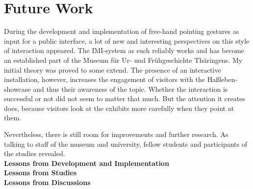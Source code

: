 \chapter{Future Work}
\label{future_work}

During the development and implementation of free-hand pointing gestures as input for a public interface, a lot of new and interesting perspectives on this style of interaction appeared. The \ac{IMI}-system as such reliably works and has become an established part of the Museum für Ur- und Frühgeschichte Thüringens. My initial theory was proved to some extend. The presence of an interactive installation, however, increases the engagement of visitors with the Haßleben-showcase and thus their awareness of the topic. Whether the interaction is successful or not did not seem to matter that much. But the attention it creates does, because visitors look at the exhibits more carefully when they point at them. 

Nevertheless, there is still room for improvements and further research. As talking to staff of the museum and university, fellow students and participants of the studies revealed.
\\
\textbf{Lessons from Development and Implementation}
\\
\textbf{Lessons from Studies}
\\
\textbf{Lessons from Discussions}

%
